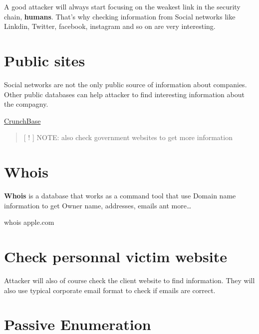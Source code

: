 \documentclass{assets/ipesethesis}
\newenvironment{Shaded}{\begin{snugshade}}{\end{snugshade}}
\newcommand{\ExtensionTok}[1]{#1}
\newcommand{\NormalTok}[1]{#1}
\begin{document}
A good attacker will always start focusing on the weakest link in the security chain, \textbf{humans}. That's why checking information from Social networks like Linkdin,
Twitter, facebook, instagram and so on are very interesting.

\hypertarget{public-sites}{%
\section*{Public sites}\label{public-sites}}

Social networks are not the only public source of information about companies. Other public databases can help attacker to find interesting information about the
compagny.

\href{https://www.crunchbase.com}{CrunchBase}

\begin{quote}
{[} ! {]} NOTE: also check government websites to get more information
\end{quote}

\hypertarget{whois}{%
\section*{Whois}\label{whois}}

\textbf{Whois} is a database that works as a command tool that use Domain name information to get Owner name, addresses, emails ant more\ldots{}

\begin{Shaded}
\begin{Highlighting}[]
\ExtensionTok{whois}\NormalTok{ apple.com}
\end{Highlighting}
\end{Shaded}

\hypertarget{check-personnal-victim-website}{%
\section*{Check personnal victim website}\label{check-personnal-victim-website}}

Attacker will also of course check the client website to find information. They will also use typical corporate email format to check if emails are correct.

\hypertarget{passive-enumeration}{%
\section*{Passive Enumeration}\label{passive-enumeration}}
\end{document}
